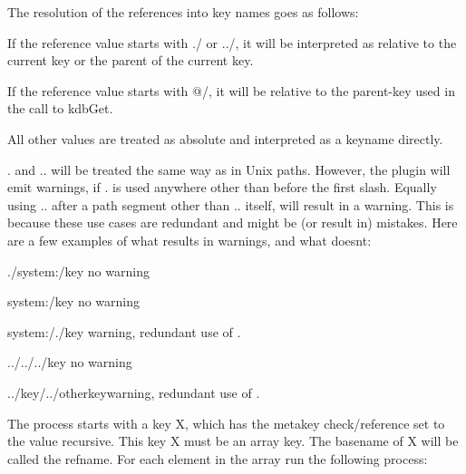 The resolution of the references into key names goes as follows\+:


\begin{DoxyItemize}
\item If the reference value starts with {\ttfamily ./} or {\ttfamily ../}, it will be interpreted as relative to the current key or the parent of the current key.
\item If the reference value starts with {\ttfamily @/}, it will be relative to the parent-\/key used in the call to {\ttfamily kdb\+Get}.
\item All other values are treated as absolute and interpreted as a keyname directly.
\item {\ttfamily .} and {\ttfamily ..} will be treated the same way as in Unix paths. However, the plugin will emit warnings, if {\ttfamily .} is used anywhere other than before the first slash. Equally using {\ttfamily ..} after a path segment other than {\ttfamily ..} itself, will result in a warning. This is because these use cases are redundant and might be (or result in) mistakes. Here are a few examples of what results in warnings, and what doesn\textquotesingle{}t\+:
\begin{DoxyItemize}
\item {\ttfamily ./system\+:/key} no warning
\item {\ttfamily system\+:/key} no warning
\item {\ttfamily system\+:/./key} warning, redundant use of {\ttfamily .}
\item {\ttfamily ../../../key} no warning
\item {\ttfamily ../key/../otherkey}warning, redundant use of {\ttfamily .}
\end{DoxyItemize}
\end{DoxyItemize}

The process starts with a key {\ttfamily X}, which has the metakey {\ttfamily check/reference} set to the value {\ttfamily recursive}. This key {\ttfamily X} must be an array key. The basename of {\ttfamily X} will be called the {\ttfamily refname}. For each element in the array run the following process\+:


